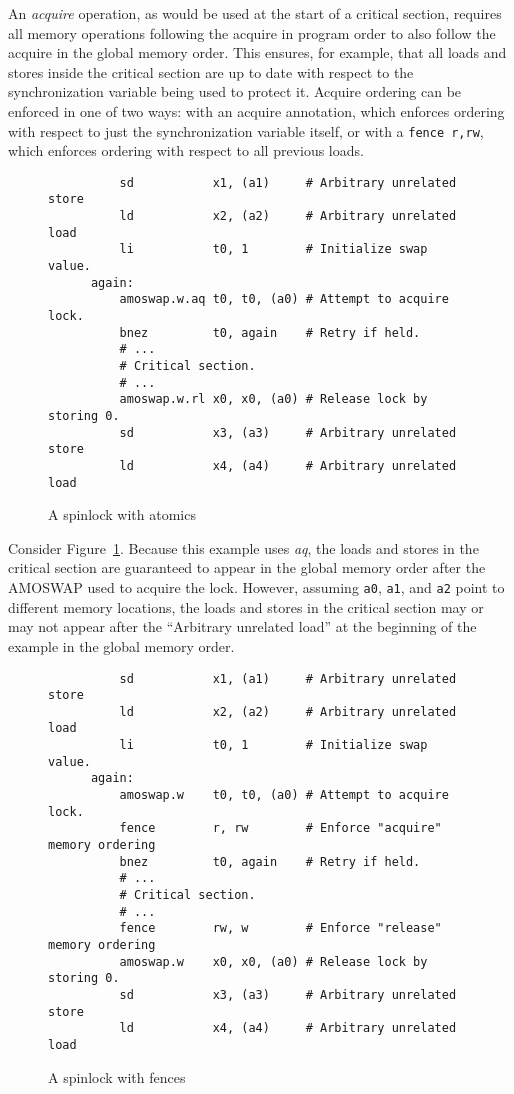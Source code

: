 An {\em acquire} operation, as would be used at the start of a critical section, requires all memory operations following the acquire in program order to also follow the acquire in the global memory order.
This ensures, for example, that all loads and stores inside the critical section are up to date with respect to the synchronization variable being used to protect it.
Acquire ordering can be enforced in one of two ways: with an acquire annotation, which enforces ordering with respect to just the synchronization variable itself, or with a {\tt fence r,rw}, which enforces ordering with respect to all previous loads.  

\begin{figure}[h!]
  \centering\small
  \begin{verbatim}
          sd           x1, (a1)     # Arbitrary unrelated store
          ld           x2, (a2)     # Arbitrary unrelated load
          li           t0, 1        # Initialize swap value.
      again:
          amoswap.w.aq t0, t0, (a0) # Attempt to acquire lock.
          bnez         t0, again    # Retry if held.
          # ...
          # Critical section.
          # ...
          amoswap.w.rl x0, x0, (a0) # Release lock by storing 0.
          sd           x3, (a3)     # Arbitrary unrelated store
          ld           x4, (a4)     # Arbitrary unrelated load
  \end{verbatim}
  \caption{A spinlock with atomics}
  \label{fig:litmus:spinlock_atomics}
\end{figure}

Consider Figure~\ref{fig:litmus:spinlock_atomics}.
Because this example uses {\em aq}, the loads and stores in the critical section are guaranteed to appear in the global memory order after the AMOSWAP used to acquire the lock.  However, assuming {\tt a0}, {\tt a1}, and {\tt a2} point to different memory locations, the loads and stores in the critical section may or may not appear after the ``Arbitrary unrelated load'' at the beginning of the example in the global memory order.

\begin{figure}[h!]
  \centering\small
  \begin{verbatim}
          sd           x1, (a1)     # Arbitrary unrelated store
          ld           x2, (a2)     # Arbitrary unrelated load
          li           t0, 1        # Initialize swap value.
      again:
          amoswap.w    t0, t0, (a0) # Attempt to acquire lock.
          fence        r, rw        # Enforce "acquire" memory ordering
          bnez         t0, again    # Retry if held.
          # ...
          # Critical section.
          # ...
          fence        rw, w        # Enforce "release" memory ordering
          amoswap.w    x0, x0, (a0) # Release lock by storing 0.
          sd           x3, (a3)     # Arbitrary unrelated store
          ld           x4, (a4)     # Arbitrary unrelated load
  \end{verbatim}
  \caption{A spinlock with fences}
  \label{fig:litmus:spinlock_fences}
\end{figure}

